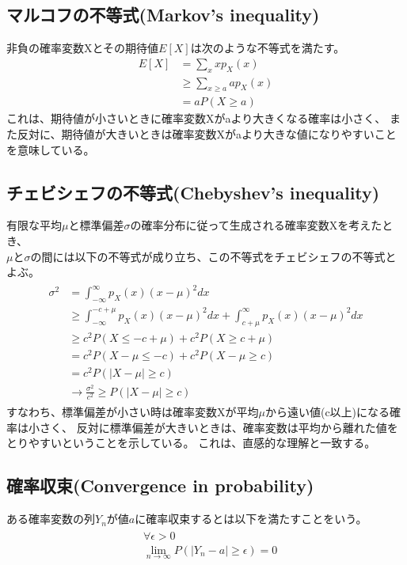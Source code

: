 \documentclass[a4j]{jarticle}
\begin{document}
\subsection{マルコフの不等式(Markov's inequality)}
非負の確率変数Xとその期待値$E[X]$は次のような不等式を満たす。
\begin{align}
    E[X]&=\sum_{x}xp_{X}(x) \\
    &\geq \sum_{x \geq a}ap_{X}(x) \\
    &= aP(X \geq a)
\end{align}
これは、期待値が小さいときに確率変数Xがaより大きくなる確率は小さく、
また反対に、期待値が大きいときは確率変数Xがaより大きな値になりやすいことを意味している。

\subsection{チェビシェフの不等式(Chebyshev's inequality)}
有限な平均$\mu$と標準偏差$\sigma$の確率分布に従って生成される確率変数Xを考えたとき、\\
$\mu$と$\sigma$の間には以下の不等式が成り立ち、この不等式をチェビシェフの不等式とよぶ。
\begin{align}
    \begin{aligned}
    \sigma^2 &= \int_{-\infty}^{\infty}p_{X}(x)(x-\mu)^2dx \\
    &\geq \int_{-\infty}^{-c+\mu}p_{X}(x)(x-\mu)^2dx+\int_{c+\mu}^{\infty}p_{X}(x)(x-\mu)^2dx \\
    &\geq c^2P(X \leq -c+\mu) + c^2P(X \geq c+\mu) \\
    &= c^2P(X - \mu \leq -c) + c^2P(X - \mu \geq c) \\
    &= c^2P(|X - \mu| \geq c) \\
    &\rightarrow \frac{\sigma^2}{c^2} \geq P(|X - \mu| \geq c)
    \end{aligned}
\end{align}
すなわち、標準偏差が小さい時は確率変数Xが平均$\mu$から遠い値(c以上)になる確率は小さく、
反対に標準偏差が大きいときは、確率変数は平均から離れた値をとりやすいということを示している。
これは、直感的な理解と一致する。

\subsection{確率収束(Convergence in probability)}
ある確率変数の列$Y_{n}$が値$a$に確率収束するとは以下を満たすことをいう。
\begin{align}
    \begin{aligned}
    &\forall \epsilon > 0 \\
    &\lim_{n \to \infty}P(|Y_{n}-a| \geq \epsilon)=0
    \end{aligned}  
\end{align}
\end{document}

